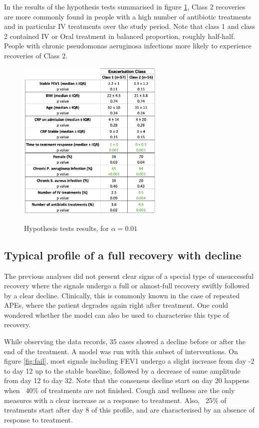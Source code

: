 In the results of the hypothesis tests summarised in figure \ref{fig:pvalue}, Class 2 recoveries are more commonly found in people with a high number of antibiotic treatments and in particular IV treatments over the study period. Note that class 1 and class 2 contained IV or Oral treatment in balanced proportion, roughly half-half. People with chronic pseudomonas aeruginosa infections more likely to experience recoveries of Class 2. 

    \begin{figure}[!h]
    \caption{Hypothesis tests results, for $\alpha=0.01$}
    \centering
    \includegraphics[width=70mm]{images/pvalue.png}
    \label{fig:pvalue}
    \end{figure}

\subsection{Typical profile of a full recovery with decline}
The previous analyses did not present clear signs of a special type of unsuccessful recovery where the signals undergo a full or almost-full recovery swiftly followed by a clear decline. Clinically, this is commonly known in the case of repeated APEs, where the patient degrades again right after treatment. One could wondered whether the model can also be used to characterise this type of recovery.

While observing the data records, 35 cases showed a decline before or after the end of the treatment. A model was run with this subset of interventions. On figure \ref{fig:fail}, most signals including FEV1 undergo a slight increase from day -2 to day 12 up to the stable baseline, followed by a decrease of same amplitude from day 12 to day 32. Note that the consensus decline start on day 20 happens when ~40\% of treatments are not finished. Cough and wellness are the only measures with a clear increase as a response to treatment. Also, ~25\% of treatments start after day 8 of this profile, and are characterised by an absence of response to treatment. 


